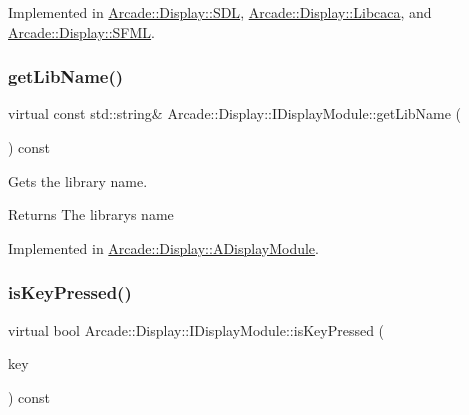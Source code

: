 Implemented in \mbox{\hyperlink{classArcade_1_1Display_1_1SDL_a3ba94b49b72c9e189f52af7b97f4ad91}{Arcade\+::\+Display\+::\+S\+DL}}, \mbox{\hyperlink{classArcade_1_1Display_1_1Libcaca_a741fdec5c2e77cc7959e5f3444f8c8ac}{Arcade\+::\+Display\+::\+Libcaca}}, and \mbox{\hyperlink{classArcade_1_1Display_1_1SFML_ae2bf9e9c157a9f0ae8d1b60bd072e881}{Arcade\+::\+Display\+::\+S\+F\+ML}}.

\mbox{\label{classArcade_1_1Display_1_1IDisplayModule_a0d8e957815e94766bdefbd7a5043e81a}} 
\subsubsection{\texorpdfstring{getLibName()}{getLibName()}}
{\footnotesize\ttfamily virtual const std\+::string\& Arcade\+::\+Display\+::\+I\+Display\+Module\+::get\+Lib\+Name (\begin{DoxyParamCaption}{ }\end{DoxyParamCaption}) const\hspace{0.3cm}{\ttfamily [pure virtual]}}



Gets the library name. 

\begin{DoxyReturn}{Returns}
The library\textquotesingle{}s name 
\end{DoxyReturn}


Implemented in \mbox{\hyperlink{classArcade_1_1Display_1_1ADisplayModule_a0f7d98b279058994f41978b17bb14222}{Arcade\+::\+Display\+::\+A\+Display\+Module}}.

\mbox{\label{classArcade_1_1Display_1_1IDisplayModule_af871661ff84c21581cd7233ba6f27aa0}} 
\subsubsection{\texorpdfstring{isKeyPressed()}{isKeyPressed()}}
{\footnotesize\ttfamily virtual bool Arcade\+::\+Display\+::\+I\+Display\+Module\+::is\+Key\+Pressed (\begin{DoxyParamCaption}\item[{\mbox{\hyperlink{classArcade_1_1Display_1_1IDisplayModule_a8da3f6b309ca0581473ae8cc8789b619}{I\+Display\+Module\+::\+Keys}}}]{key }\end{DoxyParamCaption}) const\hspace{0.3cm}{\ttfamily [pure virtual]}}



